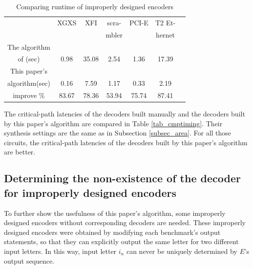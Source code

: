 \documentclass[journal]{IEEEtran}
\begin{document}
\begin{table}[t]
\centering
\caption{Comparing runtime of improperly designed encoders}
\begin{tabular}{|c|c|c|c|c|c|c|}
\hline
                                        &XGXS     &XFI       &scra-     &PCI-E    &T2 Et-\\
                                        &         &          &mbler     &        &hernet\\ \hline
The algorithm      &&&&&\\
of \cite{ShengYuShen:fmcad10}(sec)    &0.98     &35.08     &2.54      &1.36    &17.39\\\hline
This paper's                          &&&&&\\
algorithm(sec)                        &0.16     &7.59     &1.17      &0.33    &2.19\\\hline
improve \%                            &83.67    &78.36    &53.94     &75.74   &87.41\\\hline
\end{tabular}\label{tab_impdes}
\end{table}

The critical-path latencies of the decoders built manually
and the decoders built by this paper's algorithm are compared in Table \ref{tab_cmptiming}.
Their synthesis settings are the same as in Subsection \ref{subsec_area}.
For all those circuits,
the critical-path latencies of the decoders built by this paper's algorithm are better.

%



\subsection{Determining the non-existence of the decoder for improperly designed encoders}\label{subsec_improp}
To further show the usefulness of this paper's algorithm,
some improperly designed encoders without corresponding decoders are needed.
These improperly designed encoders were obtained by modifying each benchmark's output statements,
so that they can explicitly output the same letter for two different input letters.
In this way,
input letter $i_n$ can never be uniquely determined by $E$'s output sequence.
\end{document}
